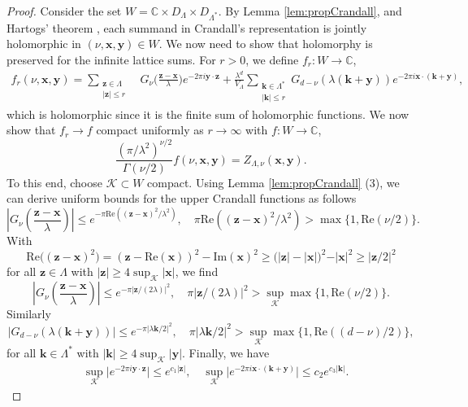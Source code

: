 \documentclass[]{amsart}
\newcommand{\new}[1]{#1}
\newcommand{\zeps}[3]{\new{Z_{#1} (#2, #3)}}
\numberwithin{mythm}{section}
\begin{document}
\begin{proof}
Consider the set 
$W=
\mathds C\times D_\Lambda \times D_{\Lambda^\ast}$.
By
Lemma \ref{lem:propCrandall},
and Hartogs' theorem \cite[Theorem 2.2.8]{hormanderIntroductionComplexAnalysis1990},
 each summand in Crandall's representation is jointly holomorphic in $(\nu,\bm x,\bm y) \in W$. We now need to show that holomorphy is preserved for the infinite lattice sums.  
For $r>0$, we define $f_r: W\to \mathds C$,
\begin{align*}
f_r(\nu,\bm x,\bm y) =
\sum_{\substack{\bm{z}\in\Lambda \\ |\bm z|\le r}}
&G_{\nu}\Big(\frac{\bm{z}-\bm{x}}{\lambda}\Big)e^{-2\pi i\bm{y}\cdot\bm{z}}
+\frac{\lambda^d}{V_{\Lambda}}
\sum_{\substack{\bm{k}\in\Lambda^\ast \\ |\bm k|\le r}}G_{d-\nu}
(\lambda(\bm{k}+\bm{y}))e^{-2\pi i\bm{x}\cdot(\bm{k}+\bm{y})},
\end{align*}
which is holomorphic since it is the finite sum of holomorphic functions. We now show that $f_r\to f$ compact uniformly as $r \to \infty$ with $f:W\to \mathds C$,
\[
\frac{(\pi/\lambda^2 )^{\nu/2}}{\Gamma(\nu/2)} f(\nu,\bm x,\bm y) = \zeps{\Lambda,\nu}{\bm x}{\bm y}.
\]
To this end, choose $\mathcal K\subset W$ compact.  Using
Lemma \ref{lem:propCrandall} (3), we can derive uniform bounds for the upper Crandall functions as follows
 \[
 \left\vert G_\nu\left(\frac{\bm z-\bm x}{\lambda}\right)\right\vert \le e^{-\pi \mathrm{Re}((\bm z-\bm x)^2/\lambda^2)},\quad \pi \mathrm{Re}((\bm z-\bm x)^2/\lambda^2)>\max\{1,\mathrm{Re}(\nu/2)\}.
 \]
 With \[\mathrm{Re}\Big((\bm z-\bm x)^2\Big)= (\bm z-\mathrm{Re}(\bm x))^2-\mathrm{Im}(\bm x)^2\ge \big(|\bm z|-|\bm x|\big)^2-\vert \bm x\vert^2\ge \vert \bm z/2\vert^2\] 
 for all $\bm z\in \Lambda$ with $\vert \bm z \vert\ge 4 \sup_{\mathcal K}\vert \bm x\vert$, we find
 \[
 \left\vert G_\nu\left(\frac{\bm z-\bm x}{\lambda}\right)\right\vert \le e^{-\pi \vert \bm z/(2\lambda)|^2 },\quad \pi \vert \bm z/(2\lambda)\vert^2> \sup_{\mathcal K} \max\{1,\mathrm{Re}(\nu/2)\}.
 \]
 Similarly
 \[
 \left\vert G_{d-\nu}\left(\lambda(\bm k+\bm y)\right)\right\vert \le e^{-\pi \vert \lambda \bm k/2|^2 },\quad \pi \vert \lambda \bm k/2|^2 > \sup_{\mathcal K} \max\{1,\mathrm{Re}((d-\nu)/2)\},
 \]
 for all $\bm k\in \Lambda^\ast$ with $\vert \bm k \vert\ge 4 \sup_{\mathcal K}\vert \bm y\vert$. Finally, we have
\begin{align*}
&\sup_{\mathcal K}\vert e^{-2\pi i \bm y\cdot \bm z}\vert \le e^{c_1 \vert \bm z\vert},\quad  \sup_{\mathcal K}\vert e^{-2\pi i \bm x\cdot (\bm k+\bm y)}\vert \le    c_2 e^{c_3 \vert \bm k\vert}.

\end{align*}
\end{proof}
\end{document}
